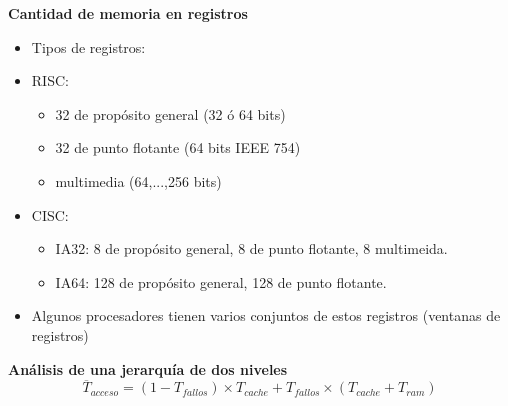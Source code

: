 \documentclass{article}
\begin{document}
\textbf{Cantidad de memoria en registros}
\begin{itemize}
\item Tipos de registros:

\item RISC:
	\begin{itemize}
	\item 32 de propósito general (32 ó 64 bits)
	\item 32 de punto flotante (64 bits IEEE 754)
	\item multimedia (64,...,256 bits)
	\end{itemize}

\item CISC: 
	\begin{itemize}
	\item IA32: 8 de propósito general, 8 de punto flotante, 8 multimeida.
	\item IA64: 128 de propósito general, 128 de punto flotante.
	\end{itemize}

\item Algunos procesadores tienen varios conjuntos de estos registros (ventanas de registros)
\end{itemize}

\textbf{Análisis de una jerarquía de dos niveles}
\begin{equation*}
\overline{T}_{acceso}=(1-T_{fallos})\times T_{cache}+T_{fallos}\times(T_{cache}+T_{ram})
\end{equation*}
\end{document}
